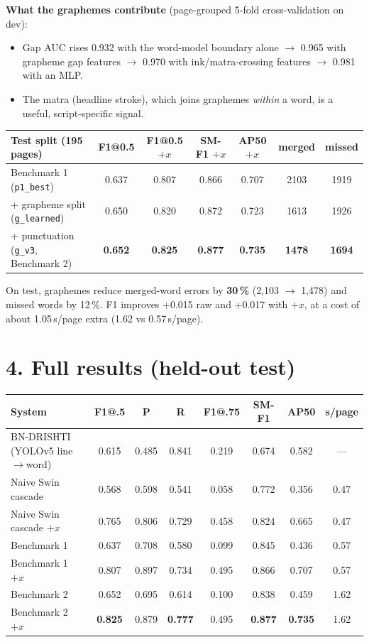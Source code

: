 \documentclass[10.5pt,a4paper]{article}
\newcommand{\best}[1]{\textbf{#1}}
\begin{document}
\textbf{What the graphemes contribute} (page-grouped 5-fold cross-validation on dev):
\begin{itemize}
  \item Gap AUC rises 0.932 with the word-model boundary alone $\rightarrow$ 0.965 with grapheme gap
        features $\rightarrow$ 0.970 with ink/matra-crossing features $\rightarrow$ 0.981 with an MLP.
  \item The matra (headline stroke), which joins graphemes \emph{within} a word, is a useful,
        script-specific signal.
\end{itemize}

\begin{center}\small
\begin{tabular}{lcccccc}
\toprule
Test split (195 pages) & F1@0.5 & F1@0.5 $+x$ & SM-F1 $+x$ & AP50 $+x$ & merged & missed\\
\midrule
Benchmark 1 (\texttt{p1\_best}) & 0.637 & 0.807 & 0.866 & 0.707 & 2103 & 1919\\
+ grapheme split (\texttt{g\_learned}) & 0.650 & 0.820 & 0.872 & 0.723 & 1613 & 1926\\
+ punctuation (\texttt{g\_v3}, Benchmark 2) & \best{0.652} & \best{0.825} & \best{0.877} & \best{0.735} & \best{1478} & \best{1694}\\
\bottomrule
\end{tabular}
\end{center}

On test, graphemes reduce merged-word errors by \textbf{30\,\%} (2{,}103 $\rightarrow$ 1{,}478) and
missed words by 12\,\%. F1 improves +0.015 raw and +0.017 with $+x$, at a cost of about 1.05\,s/page
extra (1.62 vs 0.57\,s/page).

\section*{4. Full results (held-out test)}
\begin{center}\small
\begin{tabular}{lccccccc}
\toprule
System & F1@.5 & P & R & F1@.75 & SM-F1 & AP50 & s/page\\
\midrule
BN-DRISHTI (YOLOv5 line$\rightarrow$word) & 0.615 & 0.485 & 0.841 & 0.219 & 0.674 & 0.582 & --- \\
Naive Swin cascade & 0.568 & 0.598 & 0.541 & 0.058 & 0.772 & 0.356 & 0.47\\
Naive Swin cascade $+x$ & 0.765 & 0.806 & 0.729 & 0.458 & 0.824 & 0.665 & 0.47\\
Benchmark 1 & 0.637 & 0.708 & 0.580 & 0.099 & 0.845 & 0.436 & 0.57\\
Benchmark 1 $+x$ & 0.807 & 0.897 & 0.734 & 0.495 & 0.866 & 0.707 & 0.57\\
Benchmark 2 & 0.652 & 0.695 & 0.614 & 0.100 & 0.838 & 0.459 & 1.62\\
Benchmark 2 $+x$ & \best{0.825} & 0.879 & \best{0.777} & 0.495 & \best{0.877} & \best{0.735} & 1.62\\
\bottomrule
\end{tabular}
\end{center}
\end{document}
